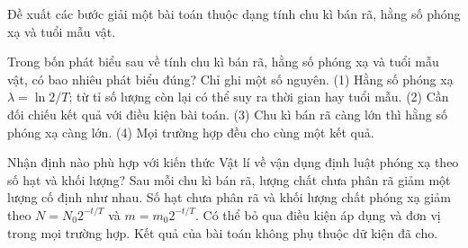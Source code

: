 \begin{bt}
Đề xuất các bước giải một bài toán thuộc dạng tính chu kì bán rã, hằng số phóng xạ và tuổi mẫu vật.
\end{bt}

\begin{ex}
Trong bốn phát biểu sau về tính chu kì bán rã, hằng số phóng xạ và tuổi mẫu vật, có bao nhiêu phát biểu đúng? Chỉ ghi một số nguyên. (1) Hằng số phóng xạ $\lambda=\ln2/T$; từ tỉ số lượng còn lại có thể suy ra thời gian hay tuổi mẫu. (2) Cần đối chiếu kết quả với điều kiện bài toán. (3) Chu kì bán rã càng lớn thì hằng số phóng xạ càng lớn. (4) Mọi trường hợp đều cho cùng một kết quả.
\end{ex}

\begin{ex}
Nhận định nào phù hợp với kiến thức Vật lí về vận dụng định luật phóng xạ theo số hạt và khối lượng?
\choice
{Sau mỗi chu kì bán rã, lượng chất chưa phân rã giảm một lượng cố định như nhau.}
{\True Số hạt chưa phân rã và khối lượng chất phóng xạ giảm theo $N=N_0 2^{-t/T}$ và $m=m_0 2^{-t/T}$.}
{Có thể bỏ qua điều kiện áp dụng và đơn vị trong mọi trường hợp.}
{Kết quả của bài toán không phụ thuộc dữ kiện đã cho.}
\end{ex}

